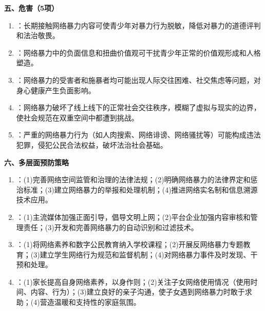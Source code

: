 \begin{keybox}
\textbf{五、危害（5项）}
\begin{enumerate}[leftmargin=*]
    \item {}：长期接触网络暴力内容可使青少年对暴力行为脱敏，降低对暴力的道德评判和法治敬畏。
    \item {}：网络暴力中的负面信息和扭曲价值观可干扰青少年正常的价值观形成和人格塑造。
    \item {}：网络暴力的受害者和施暴者均可能出现人际交往困难、社交焦虑等问题，对身心健康产生负面影响。
    \item {}：网络暴力破坏了线上线下的正常社会交往秩序，模糊了虚拟与现实的边界，使社会规范在双重空间中都遭到挑战。
    \item {}：严重的网络暴力行为（如人肉搜索、网络诽谤、网络骚扰等）可能构成违法犯罪，侵犯公民合法权益，破坏法治社会基础。
\end{enumerate}

\textbf{六、多层面预防策略}
\begin{enumerate}[leftmargin=*]
    \item {}：(1)完善网络空间监管和治理的法律法规；(2)明确网络暴力的法律界定和惩治标准；(3)建立网络暴力的举报和处理机制；(4)推进网络实名制和信息溯源技术应用。
    \item {}：(1)主流媒体加强正面引导，倡导文明上网；(2)平台企业加强内容审核和管理责任；(3)开发和完善网络暴力的自动识别和过滤技术。
    \item {}：(1)将网络素养和数字公民教育纳入学校课程；(2)开展反网络暴力专题教育；(3)建立学生网络行为规范和监督机制；(4)对网络暴力事件及时发现、干预和处理。
    \item {}：(1)家长提高自身网络素养，以身作则；(2)关注子女网络使用情况（使用时间、内容、行为）；(3)建立良好的亲子沟通，使子女遇到网络暴力时敢于求助；(4)营造温暖和支持性的家庭氛围。
\end{enumerate}
\end{keybox}

\newpage
